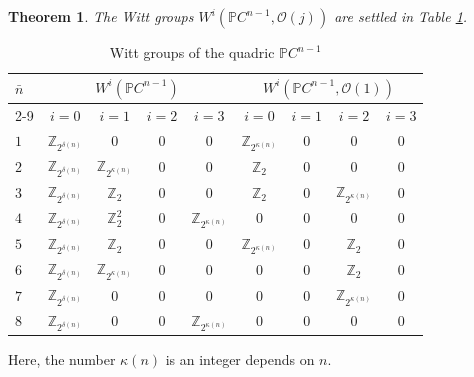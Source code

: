 \documentclass[psamsfonts]{amsart}
\theoremstyle{plain}
\newtheorem{theo}{Theorem}[section]
\theoremstyle{theorem}
\theoremstyle{definition}
\newcommand{\SO}{\mathcal{O}}
\newcommand{\Z}{\mathbb{Z}}
\newcommand{\W}{W}
\begin{document}
\begin{theo}\label{thm:Pcone}
The Witt groups $\W^i(\mathbb{P}C^{n-1}, \mathcal{O}(j))$ are settled in Table \ref{table:PCn}.

\end{theo}
\begin{table}[H]
	\footnotesize \centering
	\renewcommand{\arraystretch}{1.5}
	\begin{tabular}{|l||c|c|c|c||c|c|c|c|}
		\hline
		\multirow{2}{*}{$\bar{n}$} & \multicolumn{4}{c||}{$\W^i(\mathbb{P}C^{n-1})$} & \multicolumn{4}{c|}{$\W^i(\mathbb{P}C^{n-1}, \SO(1))$} \\
		\cline{2-9}
		& $i = 0$ & $i = 1$ & $i = 2$ & $i = 3$ & $i = 0$ & $i = 1$ & $i = 2$ & $i = 3$ \\
		\hline \hline
		$1$ & $\Z_{2^{\delta(n)}}$ & $0$ & $0$ & $0$ & $\Z_{2^{\kappa(n)}}$ & $0$ & $0$ & $0$ \\
		\hline
		$2$ & $\Z_{2^{\delta(n)}}$ & $\Z_{2^{\kappa(n)}}$ & $0$ & $0$ & $\Z_2$ & $0$ & $0$ & $0$ \\
		\hline
		$3$ & $\Z_{2^{\delta(n)}}$ & $\Z_2$ & $0$ & $0$ & $\Z_2$ & $0$ & $\Z_{2^{\kappa(n)}}$ & $0$ \\
		\hline
		$4$ & $\Z_{2^{\delta(n)}}$ & $\Z_2^2$ & $0$ & $\Z_{2^{\kappa(n)}}$ & $0$ & $0$ & $0$ & $0$ \\
		\hline
		$5$ & $\Z_{2^{\delta(n)}}$ & $\Z_2$ & $0$ & $0$ & $\Z_{2^{\kappa(n)}}$ & $0$ & $\Z_2$ & $0$ \\
		\hline
		$6$ & $\Z_{2^{\delta(n)}}$ & $\Z_{2^{\kappa(n)}}$ & $0$ & $0$ & $0$ & $0$ & $\Z_2$ & $0$ \\
		\hline
		$7$ & $\Z_{2^{\delta(n)}}$ & $0$ & $0$ & $0$ & $0$ & $0$ & $\Z_{2^{\kappa(n)}}$ & $0$ \\
		\hline
		$8$ & $\Z_{2^{\delta(n)}}$ & $0$ & $0$ & $\Z_{2^{\kappa(n)}}$ & $0$ & $0$ & $0$ & $0$ \\
		\hline
	\end{tabular}
	\caption{Witt groups of the quadric $\mathbb{P}C^{n-1}$}
	\label{table:PCn}
\end{table}
Here, the number $\kappa (n)$ is an integer depends on $n$.
\end{document}
